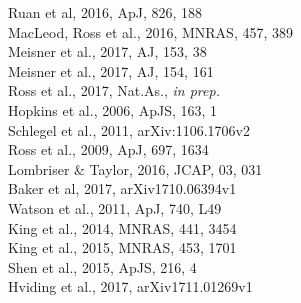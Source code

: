 \documentclass[oneside, a4paper, onecolumn, 11pt]{article}
\begin{document}
\begin{multicols}{3}[]
\rbrack Ruan et al, 2016, ApJ, 826, 188\\
\rbrack MacLeod, Ross et al., 2016, MNRAS, 457, 389\\
\rbrack Meisner et al., 2017, AJ, 153, 38 \\
\rbrack Meisner et al., 2017, AJ, 154, 161 \\
\rbrack Ross et al., 2017, Nat.As., {\it in prep.} \\
\rbrack Hopkins et al., 2006, ApJS, 163, 1\\
\rbrack Schlegel et al., 2011,  arXiv:1106.1706v2 \\
%
\rbrack Ross et al., 2009, ApJ, 697, 1634 \\
\rbrack Lombriser \& Taylor, 2016, JCAP, 03, 031 \\
\rbrack Baker et al, 2017,  arXiv1710.06394v1 \\
\rbrack Watson et al.,  2011, ApJ, 740, L49\\
\rbrack King et al., 2014, MNRAS, 441, 3454\\
\rbrack King et al., 2015, MNRAS, 453, 1701\\
\rbrack Shen et al., 2015, ApJS, 216, 4\\
\rbrack Hviding et al.,  2017, arXiv1711.01269v1 



\end{multicols}
\end{document}
